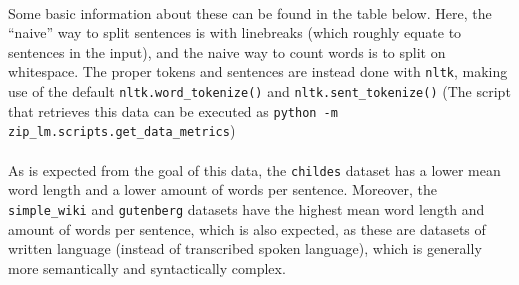 \documentclass[11pt]{article}
\begin{document}
\paragraph{}
Some basic information about these can be found in the table below. Here, the ``naive'' way to split sentences is with linebreaks (which roughly equate to sentences in the input), and the naive way to count words is to split on whitespace. The proper tokens and sentences are instead done with \verb|nltk|, making use of the default \verb|nltk.word_tokenize()| and \verb|nltk.sent_tokenize()| \parencite{loper2002nltk} (The script that retrieves this data can be executed as \verb|python -m zip_lm.scripts.get_data_metrics|)

\paragraph{}

\paragraph{}
As is expected from the goal of this data, the \verb|childes| dataset has a lower mean word length and a lower amount of words per sentence. Moreover, the \verb|simple_wiki| and \verb|gutenberg| datasets have the highest mean word length and amount of words per sentence, which is also expected, as these are datasets of written language (instead of transcribed spoken language), which is generally more semantically and syntactically complex.
\end{document}
